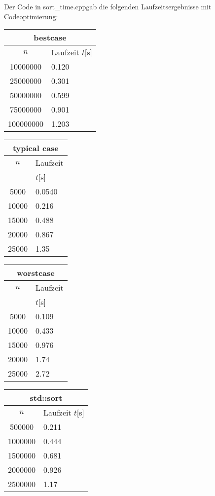 Der Code in \glqq sort\_time.cpp\grqq gab die folgenden Laufzeitsergebnisse mit Codeoptimierung:\\
\begin{tabularx}{0.24\textwidth}{|c|X|}
\hline
\multicolumn{2}{|c|}{bestcase}\\
\hline
$n$ & Laufzeit $t$[s]\\
\hline
 10000000 & 0.120 \\
\hline
 25000000 & 0.301 \\
\hline
 50000000 & 0.599 \\
\hline
 75000000 & 0.901 \\
\hline
 100000000 & 1.203 \\
\hline
\end{tabularx}
\begin{tabularx}{0.24\textwidth}{|c|X|}
\hline
\multicolumn{2}{|c|}{typical case}\\
\hline
$n$ & Laufzeit \\
 & $t$[s]\\
\hline
 5000 & 0.0540 \\
\hline
 10000 & 0.216 \\
\hline
 15000 & 0.488 \\
\hline
 20000 & 0.867 \\
\hline
 25000 & 1.35 \\
\hline
\end{tabularx}
\begin{tabularx}{0.24\textwidth}{|c|X|}
\hline
\multicolumn{2}{|c|}{worstcase}\\
\hline
$n$ & Laufzeit \\
 & $t$[s]\\
\hline
 5000 & 0.109 \\
\hline
 10000 & 0.433 \\
\hline
 15000 & 0.976 \\
\hline
 20000 & 1.74 \\
\hline
 25000 & 2.72 \\
\hline
\end{tabularx}
\begin{tabularx}{0.24\textwidth}{|c|X|}
\hline
\multicolumn{2}{|c|}{std::sort}\\
\hline
$n$ & Laufzeit $t$[s]\\
\hline
 500000 & 0.211\\
\hline
 1000000 & 0.444 \\
\hline
 1500000 & 0.681 \\
\hline
 2000000 & 0.926 \\
\hline
 2500000 & 1.17 \\
\hline
\end{tabularx}
